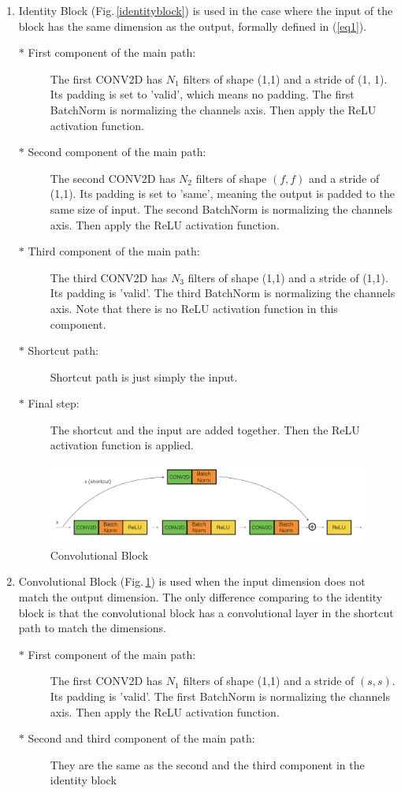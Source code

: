 \begin{enumerate}
\item  Identity Block (Fig.\,\ref{identityblock}) is used in the case where the input of the block has the same dimension as the output, formally defined in (\ref{eq1}).
    \begin{description}
      \item[$\ast$ First component of the main path:] The first CONV2D has $N_1$ filters of shape (1,1) and a stride of (1, 1). Its padding is set to 'valid', which means no padding. The first BatchNorm is normalizing the channels axis. Then apply the ReLU activation function. 
      \item[$\ast$ Second component of the main path:] The second CONV2D has $N_2$ filters of shape $(f,f)$ and a stride of (1,1). Its padding is set to 'same', meaning the output is padded to the same size of input. The second BatchNorm is normalizing the channels axis. Then apply the ReLU activation function. 
      \item[$\ast$ Third component of the main path:] The third CONV2D has $N_3$ filters of shape (1,1) and a stride of (1,1). Its padding is 'valid'. The third BatchNorm is normalizing the channels axis. Note that there is no ReLU activation function in this component.
      \item[$\ast$ Shortcut path:] Shortcut path is just simply the input.
      \item[$\ast$ Final step:] The shortcut and the input are added together. Then the ReLU activation function is applied.
    \end{description}
    
\begin{figure}[h]
\centering
\includegraphics[width=\textwidth]{Figs/convolutionblock.png}
\caption{Convolutional Block \citep{resnet_implement}}
\label{convolutionblock}
\end{figure}

\item  Convolutional Block (Fig.\,\ref{convolutionblock}) is used when the input dimension does not match the output dimension. The only difference comparing to the identity block is that the convolutional block has a convolutional layer in the shortcut path to match the dimensions.
    \begin{description}
      \item[$\ast$ First component of the main path:] The first CONV2D has $N_1$ filters of shape (1,1) and a stride of $(s,s)$. Its padding is 'valid'. The first BatchNorm is normalizing the channels axis. Then apply the ReLU activation function. 
      \item[$\ast$ Second and third component of the main path:] They are the same as the second and the third component in the identity block


\end{description}
\end{enumerate}
